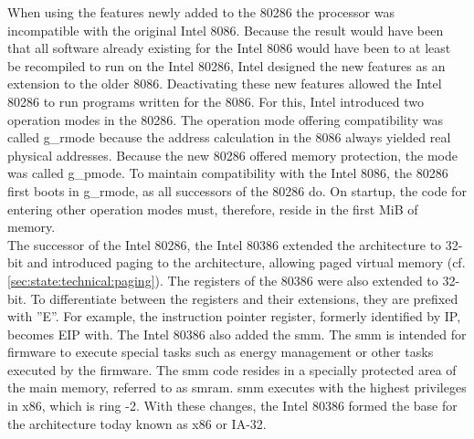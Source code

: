 When using the features newly added to the 80286 the processor was incompatible
with the original Intel 8086. Because the result would have been that all
software already existing for the Intel 8086 would have been to at least be
recompiled to run on the Intel 80286, Intel designed the new features as an
extension to the older 8086. Deactivating these new features allowed the Intel
80286 to run programs written for the 8086. For this, Intel introduced two
operation modes in the 80286. The operation mode offering compatibility was
called \gls{g_rmode} because the address calculation in the 8086 always
yielded real physical addresses. Because the new 80286 offered memory
protection, the mode was called \gls{g_pmode}. To maintain compatibility
with the Intel 8086, the 80286 first boots in \gls{g_rmode}, as all successors of
the 80286 do. On startup, the code for entering other operation modes must,
therefore, reside in the first MiB of memory. \\

The successor of the Intel 80286, the Intel 80386 extended the architecture to
32-bit and introduced paging to the architecture, allowing paged virtual memory
(cf. \ref{sec:state:technical:paging}). The registers of the 80386 were also
extended to 32-bit. To differentiate between the registers and their extensions,
they are prefixed with ''E''. For example, the instruction pointer register,
formerly identified by IP, becomes EIP with. The Intel 80386 also added the
\gls{smm}. The \gls{smm} is intended
for firmware to execute special tasks such as energy management or other tasks
executed by the firmware. The \gls{smm} code resides in a specially
protected area of the main memory, referred to as \gls{smram}. \gls{smm}
executes with the highest privileges in x86, which is ring -2. With these
changes, the Intel 80386 formed the base for the architecture today known as x86
or IA-32.\\

